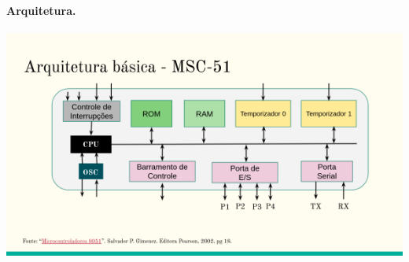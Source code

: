 \paragraph{Arquitetura.}

\begin{center}
\includegraphics[scale=.5]{img/msc51_arch.png}
\end{center}

